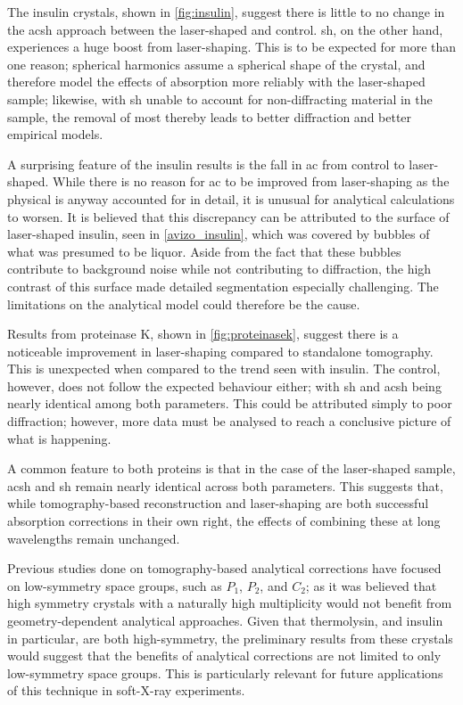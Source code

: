 The insulin crystals, shown in \cref{fig:insulin}, suggest there is little to no change in the \ac{acsh} approach between the laser-shaped and control. \Ac{sh}, on the other hand, experiences a huge boost from laser-shaping. This is to be expected for more than one reason; spherical harmonics assume a spherical shape of the crystal, and therefore model the effects of absorption more reliably with the laser-shaped sample; likewise, with \ac{sh} unable to account for non-diffracting material in the sample, the removal of most thereby leads to better diffraction and better empirical models.

A surprising feature of the insulin results is the fall in \ac{ac} from control to laser-shaped. While there is no reason for \ac{ac} to be improved from laser-shaping as the physical is anyway accounted for in detail, it is unusual for analytical calculations to worsen. It is believed that this discrepancy can be attributed to the surface of laser-shaped insulin, seen in \cref{avizo_insulin}, which was covered by bubbles of what was presumed to be liquor. Aside from the fact that these bubbles contribute to background noise while not contributing to diffraction, the high contrast of this surface made detailed segmentation especially challenging. The limitations on the analytical model could therefore be the cause. %

Results from proteinase K, shown in \cref{fig:proteinasek}, suggest there is a noticeable improvement in laser-shaping compared to standalone tomography. This is unexpected when compared to the trend seen with insulin. The control, however, does not follow the expected behaviour either; with \ac{sh} and \ac{acsh} being nearly identical among both parameters. This could be attributed simply to poor diffraction; however, more data must be analysed to reach a conclusive picture of what is happening.

A common feature to both proteins is that in the case of the laser-shaped sample, \ac{acsh} and \ac{sh} remain nearly identical across both parameters.
This suggests that, while tomography-based reconstruction and laser-shaping are both successful absorption corrections in their own right, the effects of combining these at long wavelengths remain unchanged.

Previous studies done on tomography-based analytical corrections have focused on low-symmetry space groups, such as $P_1$, $P_2$, and $C_2$; as it was believed that high symmetry crystals with a naturally high multiplicity would not benefit from geometry-dependent analytical approaches. Given that thermolysin, and insulin in particular, are both high-symmetry, the preliminary results from these crystals would suggest that the benefits of analytical corrections are not limited to only low-symmetry space groups. This is particularly relevant for future applications of this technique in soft-X-ray experiments.

